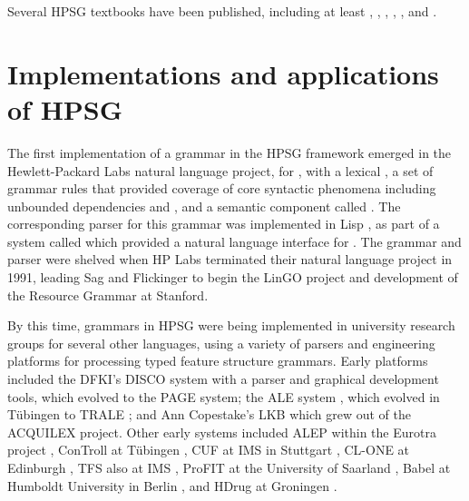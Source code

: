 \documentclass[output=paper,biblatex,babelshorthands,newtxmath,draftmode,colorlinks,citecolor=brown]{langscibook}
\begin{document}
Several HPSG textbooks have been published, including at least \citet{Borsley91a,Borsley96a-u}, \citet{SagW99a-u}, \citet*{SWB2003a}, \citet{MuellerLehrbuch1,MuellerGTBuch2,MuellerGT-Eng4}, \citet{Kim2016a-u}, and \citet{Levine2017a-u}.   

\section{Implementations and applications of HPSG}

The first implementation of a grammar in the HPSG framework emerged in the Hewlett-Packard Labs natural language project, for , with a lexical  \citep*{FPW85a}, a set of grammar rules that provided coverage of core syntactic phenomena including unbounded dependencies and , and a semantic component called  \citep{LaubNerb1991}.  The corresponding parser for this grammar was implemented in Lisp \citep{PP85}, as part of a system called  \citep{NerProud1987} which provided a natural language interface for .  The grammar and parser were shelved when HP Labs terminated their natural language project in 1991, leading Sag and Flickinger to begin the LinGO project and development of the  Resource Grammar at Stanford.

By this time, grammars in HPSG were being implemented in university research groups for several other languages, using a variety of parsers and engineering platforms for processing typed feature structure grammars.  Early platforms included the DFKI's DISCO system \citep{DISCO94} with a parser and graphical development tools, which evolved to the PAGE system; the ALE system \citep{Franz:90,CP96}, which evolved in Tübingen to TRALE \citep*{MPR2002a-u,Penn2004a-u}; and Ann Copestake's LKB\indexlkb \citep{Copestake2002a} which grew out of the ACQUILEX project.  Other early systems included ALEP within the Eurotra project \citep{SimpGron1994}, ConTroll at Tübingen \citep{GoetzMeurers1997}, CUF at IMS in Stuttgart \citep{DD93a-u}, CL-ONE at Edinburgh \citep{Manandhar1994}, TFS also at IMS \citep{Emele94a-u}, ProFIT at the University of Saarland \citep{Erbach95a}, Babel at Humboldt University in Berlin \citep{Babel}, and HDrug at Groningen \citep{NB97b-u}.  
\end{document}

